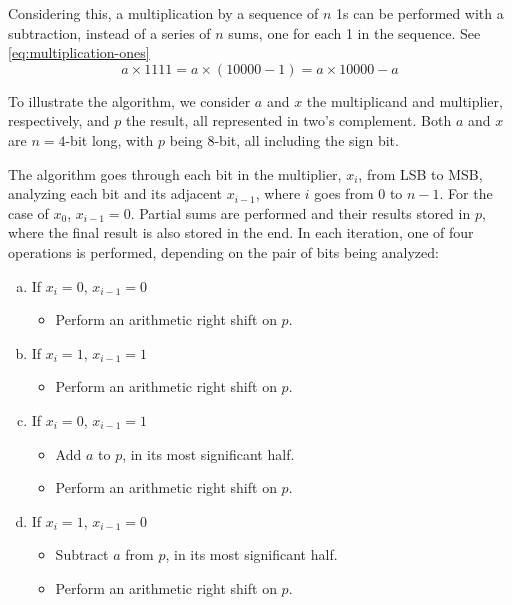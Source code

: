 \documentclass[titlepage]{article}
\begin{document}
Considering this, a multiplication by a sequence of $n$ 1s can be performed with a subtraction, instead of a series of $n$ sums, one for each 1 in the sequence.
See \eqref{eq:multiplication-ones}
\begin{equation}
    \label{eq:multiplication-ones}
    a \times 1111 = a \times \left( 10000 - 1 \right) = a \times 10000 - a
\end{equation}\par

To illustrate the algorithm, we consider $a$ and $x$ the multiplicand and multiplier, respectively, and $p$ the result, all represented in two's complement.
Both $a$ and $x$ are $n = 4$-bit long, with $p$ being 8-bit, all including the sign bit.\par

The algorithm goes through each bit in the multiplier, $x_i$, from LSB to MSB, analyzing each bit and its adjacent $x_{i-1}$, where $i$ goes from $0$ to $n-1$.
For the case of $x_0$, $x_{i-1} = 0$.
Partial sums are performed and their results stored in $p$, where the final result is also stored in the end.
In each iteration, one of four operations is performed, depending on the pair of bits being analyzed:
\begin{enumerate}[a)]
    \item If $x_i = 0$, $x_{i-1} = 0$
        \begin{itemize}
            \item Perform an arithmetic right shift on $p$.
        \end{itemize}
    \item If $x_i = 1$, $x_{i-1} = 1$
        \begin{itemize}
            \item Perform an arithmetic right shift on $p$.
        \end{itemize}
    \item If $x_i = 0$, $x_{i-1} = 1$
        \begin{itemize}
            \item Add $a$ to $p$, in its most significant half.
            \item Perform an arithmetic right shift on $p$.
        \end{itemize}
    \item If $x_i = 1$, $x_{i-1} = 0$
        \begin{itemize}
            \item Subtract $a$ from $p$, in its most significant half.
            \item Perform an arithmetic right shift on $p$.
        \end{itemize}
\end{enumerate}\par
\end{document}
